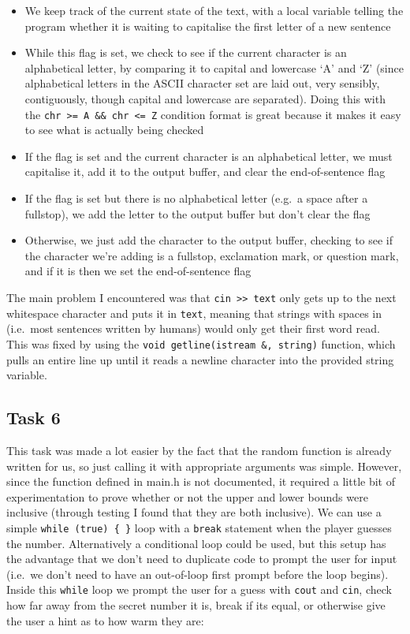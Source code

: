 \documentclass[
]{article}
\providecommand{\tightlist}{%
  \setlength{\itemsep}{0pt}\setlength{\parskip}{0pt}}
\begin{document}
\begin{itemize}
\tightlist
\item
  We keep track of the current state of the text, with a local variable
  telling the program whether it is waiting to capitalise the first
  letter of a new sentence
\item
  While this flag is set, we check to see if the current character is an
  alphabetical letter, by comparing it to capital and lowercase `A' and
  `Z' (since alphabetical letters in the ASCII character set are laid
  out, very sensibly, contiguously, though capital and lowercase are
  separated). Doing this with the
  \texttt{chr\ \textgreater{}=\ \textquotesingle{}A\textquotesingle{}\ \&\&\ chr\ \textless{}=\ \textquotesingle{}Z\textquotesingle{}}
  condition format is great because it makes it easy to see what is
  actually being checked
\item
  If the flag is set and the current character is an alphabetical
  letter, we must capitalise it, add it to the output buffer, and clear
  the end-of-sentence flag
\item
  If the flag is set but there is no alphabetical letter (e.g.~a space
  after a fullstop), we add the letter to the output buffer but don't
  clear the flag
\item
  Otherwise, we just add the character to the output buffer, checking to
  see if the character we're adding is a fullstop, exclamation mark, or
  question mark, and if it is then we set the end-of-sentence flag
\end{itemize}

The main problem I encountered was that
\texttt{cin\ \textgreater{}\textgreater{}\ text} only gets up to the
next whitespace character and puts it in \texttt{text}, meaning that
strings with spaces in (i.e.~most sentences written by humans) would
only get their first word read. This was fixed by using the
\texttt{void\ getline(istream\ \&,\ string)} function, which pulls an
entire line up until it reads a newline character into the provided
string variable.

\subsection{Task 6}\label{task-6}

This task was made a lot easier by the fact that the random function is
already written for us, so just calling it with appropriate arguments
was simple. However, since the function defined in main.h is not
documented, it required a little bit of experimentation to prove whether
or not the upper and lower bounds were inclusive (through testing I
found that they are both inclusive). We can use a simple
\texttt{while\ (true)\ \{\ \}} loop with a \texttt{break} statement when
the player guesses the number. Alternatively a conditional loop could be
used, but this setup has the advantage that we don't need to duplicate
code to prompt the user for input (i.e.~we don't need to have an
out-of-loop first prompt before the loop begins). Inside this
\texttt{while} loop we prompt the user for a guess with \texttt{cout}
and \texttt{cin}, check how far away from the secret number it is, break
if its equal, or otherwise give the user a hint as to how warm they are:
\end{document}
